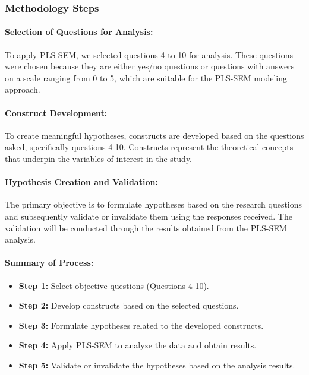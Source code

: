 \subsubsection{Methodology Steps}

\paragraph*{Selection of Questions for Analysis:} To apply PLS-SEM, we selected questions 4 to 10 for analysis. These questions were chosen because they are either yes/no questions or questions with answers on a scale ranging from 0 to 5, which are suitable for the PLS-SEM modeling approach.

\paragraph*{Construct Development:} To create meaningful hypotheses, constructs are developed based on the questions asked, specifically questions 4-10. Constructs represent the theoretical concepts that underpin the variables of interest in the study.

\paragraph*{Hypothesis Creation and Validation:} The primary objective is to formulate hypotheses based on the research questions and subsequently validate or invalidate them using the responses received. The validation will be conducted through the results obtained from the PLS-SEM analysis.

\paragraph*{Summary of Process:}

\begin{itemize}
    \item \textbf{Step 1:} Select objective questions (Questions 4-10).
    \item \textbf{Step 2:} Develop constructs based on the selected questions.
    \item \textbf{Step 3:} Formulate hypotheses related to the developed constructs.
    \item \textbf{Step 4:} Apply PLS-SEM to analyze the data and obtain results.
    \item \textbf{Step 5:} Validate or invalidate the hypotheses based on the analysis results.
\end{itemize}

